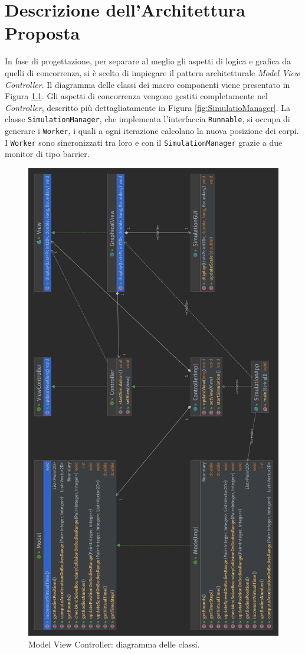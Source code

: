 \documentclass[12pt,a4paper,openright,twoside]{book}
\begin{document}
\chapter{Descrizione dell'Architettura Proposta}
\label{chap:Descrizione dell'Architettura Proposta}

In fase di progettazione, per separare al meglio gli aspetti di logica e grafica da quelli di concorrenza, si è scelto di
impiegare il pattern architetturale \textit{Model View Controller}.
Il diagramma delle classi dei macro componenti viene presentato in Figura \ref{fig:mvc}.
Gli aspetti di concorrenza vengono gestiti completamente nel \textit{Controller},
descritto più dettagliatamente in Figura \ref{fig:SimulatioManager}.
La classe \texttt{SimulationManager}, che implementa l'interfaccia \texttt{Runnable},
si occupa di generare i \texttt{Worker}, i quali a ogni iterazione
calcolano la nuova posizione dei corpi.
I \texttt{Worker} sono sincronizzati tra loro e con il \texttt{SimulationManager}
grazie a due monitor di tipo barrier.


\begin{figure}
	\centering
	\includegraphics[width=0.7\linewidth]{figures/MVC-class-diagram.png}
	\caption{Model View Controller: diagramma delle classi.}
	\label{fig:mvc}
\end{figure}
\end{document}
